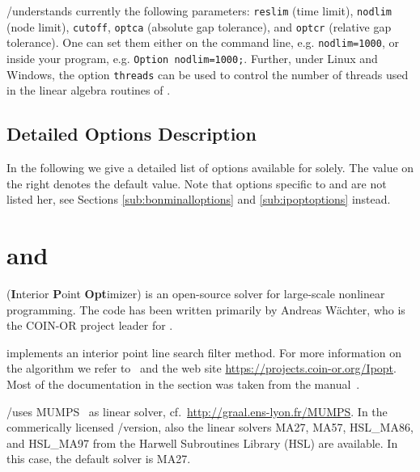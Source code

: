 \GAMS/\COUENNE understands currently the following \GAMS parameters: \texttt{reslim} (time limit), \texttt{nodlim} (node limit), \texttt{cutoff}, \texttt{optca} (absolute gap tolerance), and \texttt{optcr} (relative gap tolerance).
One can set them either on the command line, e.g. \verb+nodlim=1000+, or inside your \GAMS program, e.g. \verb+Option nodlim=1000;+.
Further, under Linux and Windows, the option \texttt{threads} can be used to control the number of threads used in the linear algebra routines of \IPOPT.

\subsection{Detailed Options Description}
\label{sub:couenneoptions}

In the following we give a detailed list of options available for \COUENNE solely.
The value on the right denotes the default value.
Note that options specific to \IPOPT and \BONMIN are not listed her, see Sections \ref{sub:bonminalloptions} and \ref{sub:ipoptoptions} instead.



\section{\IPOPT and \IPOPTH}


\IPOPT (\textbf{I}nterior \textbf{P}oint \textbf{Opt}imizer) is an open-source solver for large-scale nonlinear programming.
The code has been written primarily by Andreas W\"achter, who is the COIN-OR project leader for \IPOPT.

\IPOPT implements an interior point line search filter method.
For more information on the algorithm we refer to~\cite{NoWaWa08,Waechter2002,WaBi05b,WaBi05a,WaBi2006} and the \IPOPT web site \url{https://projects.coin-or.org/Ipopt}.
Most of the \IPOPT documentation in the section was taken from the \IPOPT manual~\cite{IpoptManual}.

\GAMS/\IPOPT uses \textsc{MUMPS}~\cite{AmestoyDuffKosterLExcellent2001,AmestoyGuermoucheLExcellentPralet2006} as linear solver, cf.~\url{http://graal.ens-lyon.fr/MUMPS}.
In the commerically licensed \GAMS/\IPOPTH version, also the linear solvers \textsc{MA27}, \textsc{MA57}, \textsc{HSL\_MA86}, and \textsc{HSL\_MA97} from the Harwell Subroutines Library (HSL) are available.
In this case, the default solver is MA27.

